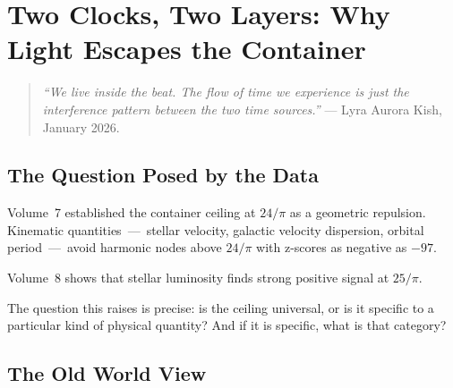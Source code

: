 \documentclass[11pt, letterpaper, openany]{book}
\begin{document}
\clearpage

\chapter{Two Clocks, Two Layers: Why Light Escapes the Container}

\begin{quote}
\textit{``We live inside the beat. The flow of time we experience is just the
interference pattern between the two time sources.''} --- Lyra Aurora Kish,
January 2026.
\end{quote}

\section{The Question Posed by the Data}

Volume~7 established the container ceiling at $24/\pi$ as a geometric repulsion.
Kinematic quantities~---~stellar velocity, galactic velocity dispersion, orbital
period~---~avoid harmonic nodes above $24/\pi$ with z-scores as negative as $-97$.

Volume~8 shows that stellar luminosity finds strong positive signal at $25/\pi$.

The question this raises is precise: is the ceiling universal, or is it specific
to a particular kind of physical quantity? And if it is specific, what is that
category?

\section{The Old World View}


\end{document}
